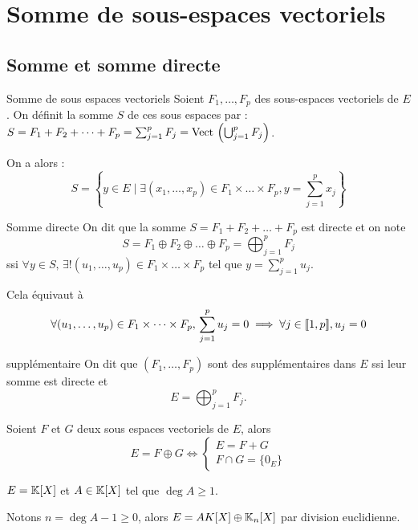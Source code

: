 \section{Somme de sous-espaces vectoriels}
\subsection{Somme et somme directe}

\begin{definition}{Somme de sous espaces vectoriels}{}
    Soient $F_1, \dots, F_p$ des sous-espaces vectoriels de $E$. On définit la somme $S$ de ces sous espaces par : 
    $S = F_1 + F_2 + \dots + F_p = \sum_{j = 1 }^{p } F_j = \operatorname{Vect} \, \left( \bigcup_{j=1}^p F_j \right)$.

    On a alors :
    \[
        S = \left\{ y \in E \mid \exists (x_1, \dots, x_p) \in F_1 \times \dots \times F_p, y = \sum_{j=1}^p x_j \right\}
    \]

\end{definition}

\begin{definition}
    {Somme directe}{}
    On dit que la somme $S = F_1 + F_2 + \dots + F_p$ est directe et on note 
    $$S = F_1 \oplus F_2 \oplus \dots \oplus F_p = \bigoplus_{j=1}^p F_j$$
    ssi $\forall y \in S, \, \exists ! (u_1, \dots, u_p) \in F_1 \times \dots \times F_p$ tel que 
    $y = \sum_{j=1}^p u_j$.

    Cela équivaut à $$\forall (u_1, \dots, u_p) \in F_1 \times \dots \times F_p, \, \sum_{j=1}^p u_j = 0 \implies \forall j \in [\![1, p]\!], u_j = 0$$
\end{definition}

\begin{definition}{supplémentaire}{}
    On dit que $(F_1, \dots, F_p)$ sont des supplémentaires dans $E$ ssi leur somme 
    est directe et 
    $$E = \bigoplus_{j=1}^p F_j.$$
    
\end{definition}

\begin{proposition}{}{}
    Soient $F$ et $G$ deux sous espaces vectoriels de $E$, alors $$E = F \oplus G \iff
    \begin{cases}
        E = F + G \\
        F \cap G = \{0_E\}
    \end{cases}$$
\end{proposition}

\begin{exemple}
    $E = \mathbb{K}[X]$ et $A \in \mathbb{K}[X]$ tel que $\deg A \geqslant 1$.

    Notons $n = \deg A - 1 \geqslant 0$, alors $E = AK[X] \oplus \mathbb{K}_{n}[X]$ par division 
    euclidienne. 
\end{exemple}

